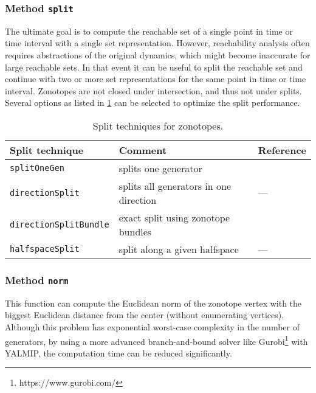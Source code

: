 \subsubsection{Method \texttt{split}} \label{sec:zono_split}

The ultimate goal is to compute the reachable set of a single point in time or time interval with a single set representation. However, reachability analysis often requires abstractions of the original dynamics, which might become inaccurate for large reachable sets. In that event it can be useful to split the reachable set and continue with two or more set representations for the same point in time or time interval. Zonotopes are not closed under intersection, and thus not under splits. Several options as listed in \cref{tab:zono_split} can be selected to optimize the split performance.

\begin{table}[h]
    \caption{Split techniques for zonotopes.}
    \centering
    \label{tab:zono_split}
    \begin{tabular}{lll}
        \toprule
        \textbf{Split technique}      & \textbf{Comment}                       & \textbf{Reference}                   \\
        \midrule
        \texttt{splitOneGen}          & splits one generator                   & \cite[Proposition 3.8]{Althoff2010a} \\
        \texttt{directionSplit}       & splits all generators in one direction & ---                                  \\
        \texttt{directionSplitBundle} & exact split using zonotope bundles     & \cite[Section V.A]{Althoff2011f}     \\
        \texttt{halfspaceSplit}       & split along a given halfspace          & ---                                  \\
        \bottomrule
    \end{tabular}
\end{table}

\subsubsection{Method \texttt{norm}} \label{sec:zono_norm}
This function can compute the Euclidean norm of the zonotope vertex with the biggest Euclidean distance from the center (without enumerating vertices). Although this problem has exponential worst-case complexity in the number of generators, by using a more advanced branch-and-bound solver like Gurobi\footnote{https://www.gurobi.com/} with YALMIP, the computation time can be reduced significantly.

